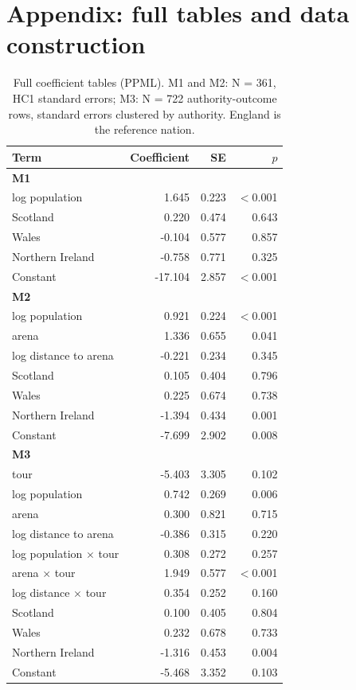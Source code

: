 \documentclass[11pt,a4paper]{article}
\begin{document}
\appendix
\section{Appendix: full tables and data construction}
\begin{table}[htbp]\centering\small\caption{Full coefficient tables (PPML). M1 and M2: N = 361, HC1 standard errors; M3: N = 722 authority-outcome rows, standard errors clustered by authority. England is the reference nation.}\label{tab:appx}\begin{tabular}{lrrr}\toprule Term & Coefficient & SE & $p$\\\midrule
\multicolumn{4}{l}{\textbf{M1}}\\
\quad log population & 1.645 & 0.223 & $<$0.001\\
\quad Scotland & 0.220 & 0.474 & 0.643\\
\quad Wales & -0.104 & 0.577 & 0.857\\
\quad Northern Ireland & -0.758 & 0.771 & 0.325\\
\quad Constant & -17.104 & 2.857 & $<$0.001\\
\multicolumn{4}{l}{\textbf{M2}}\\
\quad log population & 0.921 & 0.224 & $<$0.001\\
\quad arena & 1.336 & 0.655 & 0.041\\
\quad log distance to arena & -0.221 & 0.234 & 0.345\\
\quad Scotland & 0.105 & 0.404 & 0.796\\
\quad Wales & 0.225 & 0.674 & 0.738\\
\quad Northern Ireland & -1.394 & 0.434 & 0.001\\
\quad Constant & -7.699 & 2.902 & 0.008\\
\multicolumn{4}{l}{\textbf{M3}}\\
\quad tour & -5.403 & 3.305 & 0.102\\
\quad log population & 0.742 & 0.269 & 0.006\\
\quad arena & 0.300 & 0.821 & 0.715\\
\quad log distance to arena & -0.386 & 0.315 & 0.220\\
\quad log population $\times$ tour & 0.308 & 0.272 & 0.257\\
\quad arena $\times$ tour & 1.949 & 0.577 & $<$0.001\\
\quad log distance $\times$ tour & 0.354 & 0.252 & 0.160\\
\quad Scotland & 0.100 & 0.405 & 0.804\\
\quad Wales & 0.232 & 0.678 & 0.733\\
\quad Northern Ireland & -1.316 & 0.453 & 0.004\\
\quad Constant & -5.468 & 3.352 & 0.103\\
\bottomrule\end{tabular}\end{table}
\end{document}
